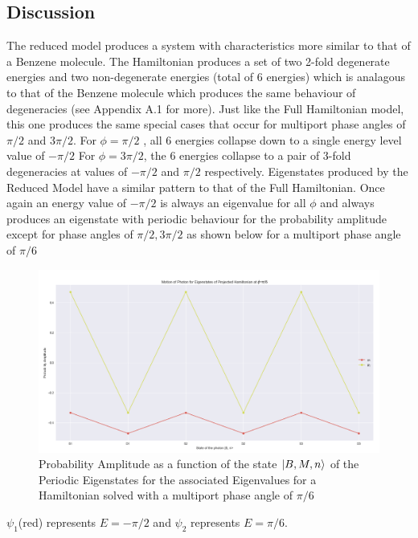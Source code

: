 \subsection{Discussion}
The reduced model produces a system with characteristics more similar to that of a Benzene molecule. The Hamiltonian produces a set of two 2-fold degenerate energies and two non-degenerate energies (total of 6 energies) which is analagous to that of the Benzene molecule which produces the same behaviour of degeneracies (see Appendix A.1 for more). \newline
Just like the Full Hamiltonian model, this one produces the same special cases that occur for multiport phase angles of $\pi/2$ and $3\pi/2$. \newline
For $\phi = \pi/2$ , all 6 energies collapse down to a single energy level value of $-\pi/2$ \newline
For $\phi = 3\pi/2$, the 6 energies collapse to a pair of 3-fold degeneracies at values of $-\pi/2$ and $\pi/2$ respectively. \newline
Eigenstates produced by the Reduced Model have a similar pattern to that of the Full Hamiltonian. Once again an energy value of $-\pi/2$ is always an eigenvalue for all $\phi$ and always produces an eigenstate with periodic behaviour for the probability amplitude except for phase angles of $\pi/2, 3\pi/2$ as shown below for a multiport phase angle of $\pi/6$
\begin{figure}[H]
    \centering
    \includegraphics[scale=0.4]{2_Body/red_state.png}
    \caption{Probability Amplitude as a function of the state $\ket{B,M,n}$ of the Periodic Eigenstates for the associated Eigenvalues for a Hamiltonian solved with a multiport phase angle of $\pi/6$ }
    \label{fig:my_label}
\end{figure}

$\psi_{1}$(red) represents $E=-\pi/2$ and $\psi_{2}$ represents $E= \pi/6$. \newline

